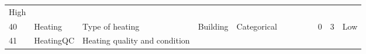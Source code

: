 \documentclass[11pt]{article}
\begin{document}
\begin{longtable}[]{@{}llllllllllll@{}}
\begin{minipage}[t]{0.04\columnwidth}
High\strut
\end{minipage}\tabularnewline
\begin{minipage}[t]{0.04\columnwidth}\raggedright\strut
40\strut
\end{minipage} & \begin{minipage}[t]{0.04\columnwidth}\raggedright\strut
Heating\strut
\end{minipage} & \begin{minipage}[t]{0.04\columnwidth}\raggedright\strut
Type of heating\strut
\end{minipage} & \begin{minipage}[t]{0.04\columnwidth}\raggedright\strut
Building\strut
\end{minipage} & \begin{minipage}[t]{0.04\columnwidth}\raggedright\strut
Categorical\strut
\end{minipage} & \begin{minipage}[t]{0.04\columnwidth}\raggedright\strut
\strut
\end{minipage} & \begin{minipage}[t]{0.04\columnwidth}\raggedright\strut
\strut
\end{minipage} & \begin{minipage}[t]{0.04\columnwidth}\raggedright\strut
\strut
\end{minipage} & \begin{minipage}[t]{0.04\columnwidth}\raggedright\strut
\strut
\end{minipage} & \begin{minipage}[t]{0.04\columnwidth}\raggedright\strut
0\strut
\end{minipage} & \begin{minipage}[t]{0.04\columnwidth}\raggedright\strut
3\strut
\end{minipage} & \begin{minipage}[t]{0.04\columnwidth}\raggedright\strut
Low\strut
\end{minipage}\tabularnewline
\begin{minipage}[t]{0.04\columnwidth}\raggedright\strut
41\strut
\end{minipage} & \begin{minipage}[t]{0.04\columnwidth}\raggedright\strut
HeatingQC\strut
\end{minipage} & \begin{minipage}[t]{0.04\columnwidth}\raggedright\strut
Heating quality and condition\strut
\end{minipage} & \begin{minipage}[t]{0.04\columnwidth}\raggedright\strut

\end{minipage}
\end{longtable}
\end{document}
